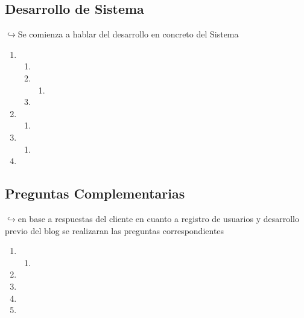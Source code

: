 \documentclass[a4paper,10pt]{article}
\begin{document}
\subsection{Desarrollo de Sistema}
$\hookrightarrow{}$Se comienza a hablar del desarrollo en concreto del Sistema
\begin{enumerate}
    \item
    \begin{enumerate}
        \item
        \item 
        \begin{enumerate}
            \item  
        \end{enumerate}
        \item 
    \end{enumerate}
    \item 
    \begin{enumerate}
        \item 
    \end{enumerate}
    \item 
    \begin{enumerate}
        \item 
    \end{enumerate}
    \item 
\end{enumerate}


\subsection{Preguntas Complementarias}
$\hookrightarrow{}$en base a respuestas del cliente en cuanto a registro de usuarios y desarrollo previo del blog se realizaran las preguntas correspondientes
\begin{enumerate}
    \item 
    \begin{enumerate}
        \item 
    \end{enumerate}
    \item 
    \item 
    \item 
    \item 
\end{enumerate}
\end{document}
